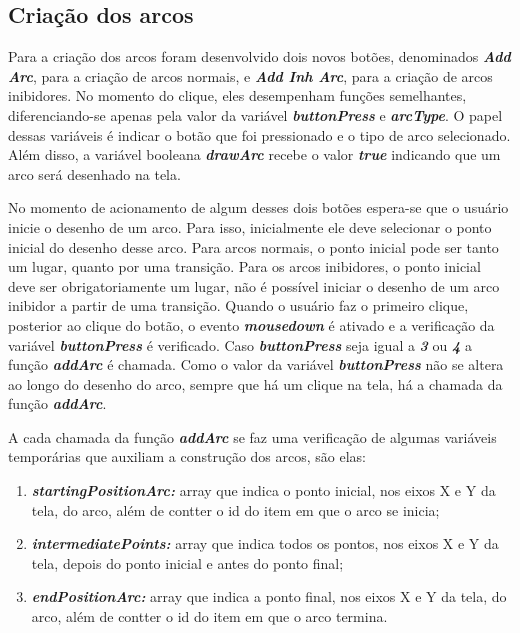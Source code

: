 \documentclass[
	12pt,				%
	openright,			%
	oneside,			%
	a4paper,			%
	english,			%
	brazil				%
	]{abntex2}
\begin{document}
\newpage

\subsection*{Criação dos arcos}

Para a criação dos arcos foram desenvolvido dois novos botões, denominados \textbf{\textit{Add Arc}}, para a criação de arcos normais, e \textbf{\textit{Add Inh Arc}}, para a criação de arcos inibidores. No momento do clique, eles desempenham funções semelhantes, diferenciando-se apenas pela valor da variável \textit{\textbf{buttonPress}} e \textbf{\textit{arcType}}. O papel dessas variáveis é indicar o botão que foi pressionado e o tipo de arco selecionado. Além disso, a variável booleana  \textbf{\textit{drawArc}} recebe o valor \textbf{\textit{true}} indicando que um arco será desenhado na tela.





No momento de acionamento de algum desses dois botões espera-se que o usuário inicie o desenho de um arco. Para isso, inicialmente ele deve selecionar o ponto inicial do desenho desse arco. Para arcos normais, o ponto inicial pode ser tanto um lugar, quanto por uma transição. Para os arcos inibidores, o ponto inicial deve ser obrigatoriamente um lugar, não é possível iniciar o desenho de um arco inibidor a partir de uma transição. Quando o usuário faz o primeiro clique, posterior ao clique do botão, o evento \textbf{\textit{mousedown}} é ativado e a verificação da variável \textbf{\textit{buttonPress}} é verificado. Caso \textbf{\textit{buttonPress}} seja igual a \textbf{\textit{3}} ou \textbf{\textit{4}} a função \textbf{\textit{addArc}} é chamada. Como o valor da variável \textbf{\textit{buttonPress}} não se altera ao longo do desenho do arco, sempre que há um clique na tela, há a chamada da função \textbf{\textit{addArc}}.

A cada chamada da função \textbf{\textit{addArc}} se faz uma verificação de algumas variáveis temporárias que auxiliam a construção dos arcos, são elas: 

\begin{enumerate}
	\item \textbf{\textit{startingPositionArc:}} array que indica o ponto inicial, nos eixos X e Y da tela, do arco, além de contter o id do item em que o arco se inicia;
	\item \textbf{\textit{intermediatePoints:}} array que indica todos os pontos, nos eixos X e Y da tela, depois do ponto inicial e antes do ponto final;
	\item \textbf{\textit{endPositionArc:}} array que indica a ponto final, nos eixos X e Y da tela, do arco, além de contter o id do item em que o arco termina.
\end{enumerate}
\end{document}
